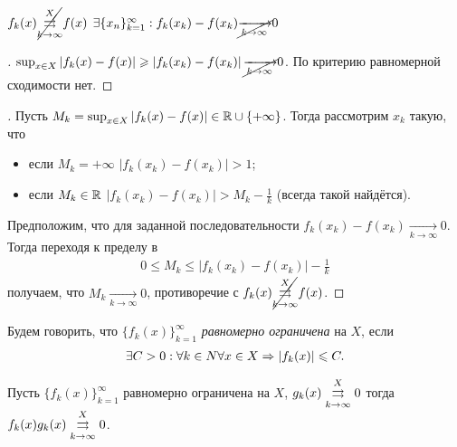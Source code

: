 \documentclass[../main.tex]{subfiles}
\begin{document}
 
 \begin{corollary}
   $ f_k(x) \cancel{\convergesuniformly{k \to \infty}{X}} f(x)$ \nas $ \exists \{x_{n}\}_{k=1}^{ \infty} : f_k(x_k ) - f(x_k ) \cancel{  \xrightarrow[k \to  \infty ]{} } 0$ 
 \end{corollary}

 \begin{proof}[\circled{\lhence}]
   $ \sup_{x \in X } \left| f_k (x) - f(x)   \right| \geq \left| f_k(x_k ) - f(x_k )  \right| \cancel{\xrightarrow[k \to  \infty ]{}} 0 $. По критерию равномерной сходимости нет. 
 \end{proof}

 \begin{proof}[\circled{\hence}]
   Пусть $ M_k = \sup_{x \in X} \left| f_k(x)  - f(x)  \right| \in \R \cup \{ + \infty \} $. Тогда рассмотрим $ x_k $ такую, что 
   \begin{itemize}
     \item если $ M_k = + \infty$ $ \left| f_k(x_k ) - f(x_k ) \right| > 1$;
     \item если $ M_k \in \R$ $ \left| f_k (x_k ) - f(x_k ) \right| > M_k - \frac{1}{k}$ (всегда такой найдётся).  
   \end{itemize}
   Предположим, что для заданной последовательности $ f_k (x_k ) - f(x_k )  \xrightarrow[k \to  \infty ]{} 0 $. Тогда переходя к пределу в 
   \begin{gather} 
      0 \leq M_k \leq \left| f_k (x_k) - f(x_k )\right| - \frac{1}{k}
   \end{gather} 
   получаем, что $ M_k  \xrightarrow[k \to  \infty ]{} 0 $, противоречие с $ f_k(x) \cancel{\convergesuniformly{k \to \infty}{X}} f(x)$. 
 \end{proof}

 
 \begin{definition} \label{def:funcseq:limited}
   Будем говорить, что $ \{ f_{k}(x) \}_{k = 1}^{\infty} $ \emph{равномерно ограничена} на $ X$, если 
   \begin{gather} 
     \exists C > 0: \forall k \in N \forall x \in X \hence \left| f_k(x)  \right| \leq C .
   \end{gather}
 \end{definition}
 
 
 \begin{proposition} \label{prop:funcseq:limdotconvtozero}
   Пусть $ \{ f_{k}(x) \}_{k = 1}^{\infty} $ равномерно ограничена на $ X$, $ g_k(x) \convergesuniformly{k \to \infty}{X} 0$ тогда $ f_k(x) g_k(x)  \convergesuniformly{k \to \infty}{X} 0$.
 \end{proposition}
 
\end{document}
